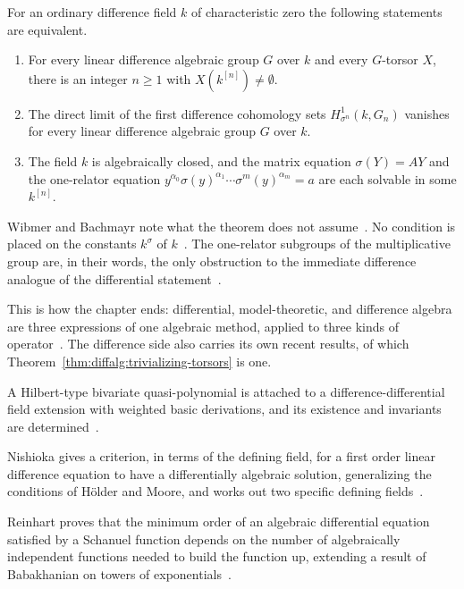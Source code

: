 \begin{theorem}\label{thm:diffalg:trivializing-torsors}
For an ordinary difference field $k$ of characteristic zero the following
statements are equivalent.
\begin{enumerate}
\item For every linear difference algebraic group $G$ over $k$ and every
$G$-torsor $X$, there is an integer $n \ge 1$ with $X(k^{[n]}) \neq \emptyset$.
\item The direct limit of the first difference cohomology sets
$H^1_{\sigma^n}(k, G_n)$ vanishes for every linear difference algebraic group
$G$ over $k$.
\item The field $k$ is algebraically closed, and the matrix equation
$\sigma(Y) = AY$ and the one-relator equation
$y^{\alpha_0}\sigma(y)^{\alpha_1}\cdots\sigma^m(y)^{\alpha_m} = a$ are each
solvable in some $k^{[n]}$.
\end{enumerate}
\end{theorem}

Wibmer and Bachmayr note what the theorem does not
assume~\cite[p.~3]{WibmerBachmayr2025}. No condition is placed on the constants
$k^\sigma$ of $k$~\cite[p.~3]{WibmerBachmayr2025}. The one-relator subgroups
of the multiplicative group are, in their words, the only obstruction to the
immediate difference analogue of the differential
statement~\cite[p.~3]{WibmerBachmayr2025}.

This is how the chapter ends: differential, model-theoretic, and difference
algebra are three expressions of one algebraic method, applied to three kinds
of operator~\cite[p.~912]{MikhalevPankratev1989}. The difference side also
carries its own recent results, of which
Theorem~\ref{thm:diffalg:trivializing-torsors} is one.

A Hilbert-type bivariate quasi-polynomial is attached to a difference-differential field extension with weighted basic derivations, and its existence and invariants are determined~\cite{WlBivariateDimensionQuasiPolynom2020}.

Nishioka gives a criterion, in terms of the defining field, for a first order linear difference equation to have a differentially algebraic solution, generalizing the conditions of H\"older and Moore, and works out two specific defining fields~\cite{WlANoteOnDifferentiallyAlgebraic1984}.

Reinhart proves that the minimum order of an algebraic differential equation satisfied by a Schanuel function depends on the number of algebraically independent functions needed to build the function up, extending a result of Babakhanian on towers of exponentials~\cite{WlOnTheOrderOfAlgebraicDifferent1995}.

